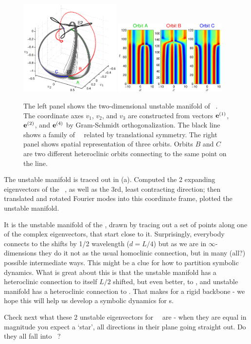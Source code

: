 \begin{figure}[t]
\begin{center}
\includegraphics[width=0.45\textwidth]{figs/ks22_E3_manifold.eps}
\includegraphics[width=0.5\textwidth]{figs/ks22_E3_orbits.eps}
\end{center}
\caption{
The left panel shows the two-dimensional
unstable manifold of \eqv\ . The coordinate axes
$v_1$, $v_2$, and $v_3$ are constructed from vectors
${\mathbf e}^{(1)}$, ${\mathbf e}^{(2)}$, and ${\mathbf e}^{(4)}$ by Gram-Schmidt orthogonalization.
The black line shows a family of ~\eqva\ related by translational
symmetry.
The right panel shows spatial representation of
three orbits. Orbits $B$ and $C$ are two different heteroclinic orbits
connecting  to the same point on the  line.
        }
\label{f:KS22E3man}
\end{figure}



The unstable manifold is traced out in
(a). Computed the 2 expanding eigenvectors
of the \eqv~, as well as the 3rd, least contracting
direction; then translated and rotated Fourier modes into this
coordinate frame, plotted the unstable manifold.

 It is the unstable manifold of the 
{\eqv}, drawn by tracing out a set of points along one of the complex
eigenvectors, that start close to it. Surprisingly, everybody connects
to the  shifts by 1/2 wavelength ($d = L/4$) but as we are in
$\infty$-dimensions they do it not as the usual homoclinic connection, but in
many (all?) possible intermediate ways. This might be a clue for how to
partition symbolic dynamics.
What is great about
this is that the  unstable manifold has a heteroclinic connection to itself
$L/2$ shifted, but
even better, to , and  unstable manifold has a heteroclinic
connection to .
That makes for a rigid backbone -
we hope this will help us develop a symbolic dynamics for \rpo s.


Check next what these 2 unstable eigenvectors for ~\eqv\ are - when they
are equal in magnitude you expect a `star', all directions in their plane
going straight out. Do they all fall into ~\eqv?

